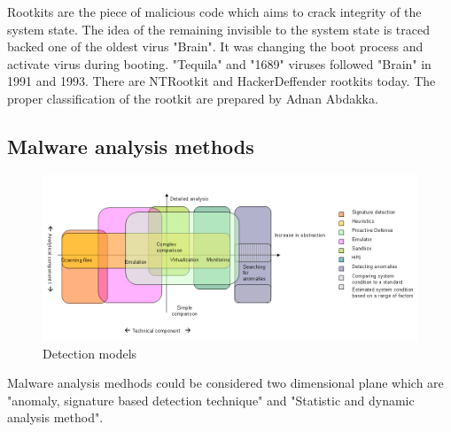Rootkits are the piece of malicious code which aims to crack integrity of the system state. The idea of the remaining invisible to the system state is traced backed one of the oldest virus "Brain"\cite{martin2008}. It was changing the boot process and activate virus during booting. "Tequila" and "1689" viruses followed "Brain" in 1991 and 1993\cite{Ducklin1991}. There are NTRootkit and HackerDeffender rootkits today. The proper classification of the rootkit are prepared by Adnan Abdakka\cite{Adnan2011}.



\subsection{Malware analysis methods}

\begin{figure}[h]
    \centering
    \includegraphics[width=1\textwidth]{alisa_1007_pic1_en.jpg}
    \caption{Detection models \cite{Shevchenko2007detc}}
    \label{fig:awesome_image}
\end{figure}
Malware analysis medhods could be considered two dimensional plane which are "anomaly, signature based detection technique" and "Statistic and dynamic analysis method". 



